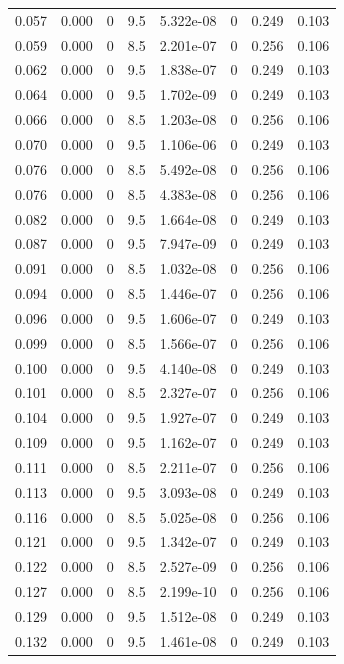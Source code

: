 \documentclass[preview]{standalone}
\begin{document}
{{\begin{tabular}{L{1.2cm}C{1.2cm} C{0.3cm}C{0.5cm} C{1.4cm}C{1.4cm} C{1.4cm}C{1.4cm}}
  0.057  &  0.000  & 0     & 9.5 &  5.322e-08  & 0  & 0.249 &  0.103   \\ 
  0.059  &  0.000  & 0     & 8.5 &  2.201e-07  & 0  & 0.256 &  0.106   \\ 
  0.062  &  0.000  & 0     & 9.5 &  1.838e-07  & 0  & 0.249 &  0.103   \\ 
  0.064  &  0.000  & 0     & 9.5 &  1.702e-09  & 0  & 0.249 &  0.103   \\ 
  0.066  &  0.000  & 0     & 8.5 &  1.203e-08  & 0  & 0.256 &  0.106   \\ 
  0.070  &  0.000  & 0     & 9.5 &  1.106e-06  & 0  & 0.249 &  0.103   \\ 
  0.076  &  0.000  & 0     & 8.5 &  5.492e-08  & 0  & 0.256 &  0.106   \\ 
  0.076  &  0.000  & 0     & 8.5 &  4.383e-08  & 0  & 0.256 &  0.106   \\ 
  0.082  &  0.000  & 0     & 9.5 &  1.664e-08  & 0  & 0.249 &  0.103   \\ 
  0.087  &  0.000  & 0     & 9.5 &  7.947e-09  & 0  & 0.249 &  0.103   \\ 
  0.091  &  0.000  & 0     & 8.5 &  1.032e-08  & 0  & 0.256 &  0.106   \\ 
  0.094  &  0.000  & 0     & 8.5 &  1.446e-07  & 0  & 0.256 &  0.106   \\ 
  0.096  &  0.000  & 0     & 9.5 &  1.606e-07  & 0  & 0.249 &  0.103   \\ 
  0.099  &  0.000  & 0     & 8.5 &  1.566e-07  & 0  & 0.256 &  0.106   \\ 
  0.100  &  0.000  & 0     & 9.5 &  4.140e-08  & 0  & 0.249 &  0.103   \\ 
  0.101  &  0.000  & 0     & 8.5 &  2.327e-07  & 0  & 0.256 &  0.106   \\ 
  0.104  &  0.000  & 0     & 9.5 &  1.927e-07  & 0  & 0.249 &  0.103   \\ 
  0.109  &  0.000  & 0     & 9.5 &  1.162e-07  & 0  & 0.249 &  0.103   \\ 
  0.111  &  0.000  & 0     & 8.5 &  2.211e-07  & 0  & 0.256 &  0.106   \\ 
  0.113  &  0.000  & 0     & 9.5 &  3.093e-08  & 0  & 0.249 &  0.103   \\ 
  0.116  &  0.000  & 0     & 8.5 &  5.025e-08  & 0  & 0.256 &  0.106   \\ 
  0.121  &  0.000  & 0     & 9.5 &  1.342e-07  & 0  & 0.249 &  0.103   \\ 
  0.122  &  0.000  & 0     & 8.5 &  2.527e-09  & 0  & 0.256 &  0.106   \\ 
  0.127  &  0.000  & 0     & 8.5 &  2.199e-10  & 0  & 0.256 &  0.106   \\ 
  0.129  &  0.000  & 0     & 9.5 &  1.512e-08  & 0  & 0.249 &  0.103   \\ 
  0.132  &  0.000  & 0     & 9.5 &  1.461e-08  & 0  & 0.249 &  0.103   \\ 
\hline 
\end{tabular} 

}}
\end{document}
